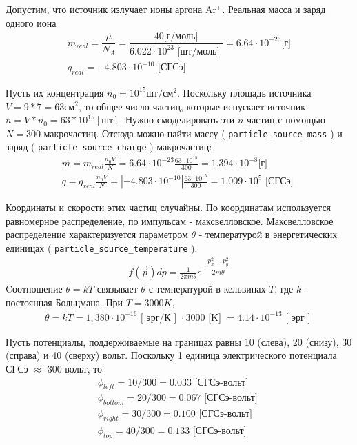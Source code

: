 Допустим, что источник излучает ионы аргона Ar$^{+}$. 
Реальная масса и заряд одного иона 
\begin{gather}
  m_{real}  
  = \dfrac{ \mu }{N_A} 
  = \dfrac{40 \mbox{[г/моль]} }{6.022 \cdot 10^{23} \mbox{ [шт/моль] } }
  = 6.64 \cdot 10^{-23} \mbox{[г]}
  \\
  q_{real} = -4.803 \cdot 10^{-10} \mbox{ [СГСэ] }
\end{gather}

Пусть их концентрация $ n_0 = 10^{15} \mbox{шт}/\mbox{см}^2$.
Поскольку площадь источника $ V = 9 * 7 = 63 \mbox{см}^2 $, то общее число частиц, которые 
испускает источник $n = V * n_0 = 63 * 10^{15} [\mbox{шт}]$.
Нужно смоделировать эти $n$ частиц с помощью $N = 300$ макрочастиц.
Отсюда можно найти массу ( \texttt{particle\_source\_mass} ) и заряд ( \texttt{particle\_source\_charge} ) макрочастиц:
\begin{gather}
  m = m_{real} \frac{ n_0 V }{ N } = 6.64 \cdot 10^{-23} \frac{63 \cdot 10^{15}}{300} = 1.394 \cdot 10^{-8} \mbox{[г]}
  \\
  q = q_{real} \frac{ n_0 V }{ N } = |-4.803 \cdot 10^{-10}| \frac{63 \cdot 10^{15}}{300} = 1.009 \cdot 10^{5} \mbox{ [СГСэ] }
\end{gather}

Координаты и скорости этих частиц случайны. 
По координатам используется равномерное распределение, по импульсам - максвелловское.
Максвелловское распределение характеризуется параметром $\theta$ - температурой в энергетических 
единицах ( \texttt{particle\_source\_temperature} ).
\begin{gather}
  f( \vec{p} ) dp = \frac{1}{ 2 \pi m \theta } e^{ - \dfrac{ p_x^2 + p_y^2 }{ 2 m \theta } }
\end{gather}
Cоотношение $\theta = k T$ связывает $\theta$ с температурой в кельвинах $T$, где $k$ - постоянная Больцмана.
При $T = 3000 K$, 
\begin{gather}
  \theta = kT = 1,380 \cdot 10^{-16} \mbox{ [ эрг/К ] } \cdot 3000 \mbox{ [K] } = 4.14 \cdot 10^{-13} \mbox{ [ эрг ] }
\end{gather}

Пусть потенциалы, поддерживаемые на границах равны 10 (слева), 20 (снизу), 30 (справа) и 40 (сверху) вольт.
Поскольку 1 единица электрического потенциала СГСэ $\approx$ 300 вольт, то
\begin{gather}
  \phi_{left} = 10 / 300 = 0.033 \mbox{ [СГСэ-вольт] }
  \\
  \phi_{bottom} = 20 / 300 = 0.067 \mbox{ [СГСэ-вольт] }
  \\
  \phi_{right} = 30 / 300 = 0.100 \mbox{ [СГСэ-вольт] }
  \\
  \phi_{top} = 40 / 300 = 0.133 \mbox{ [СГСэ-вольт] }
\end{gather}

